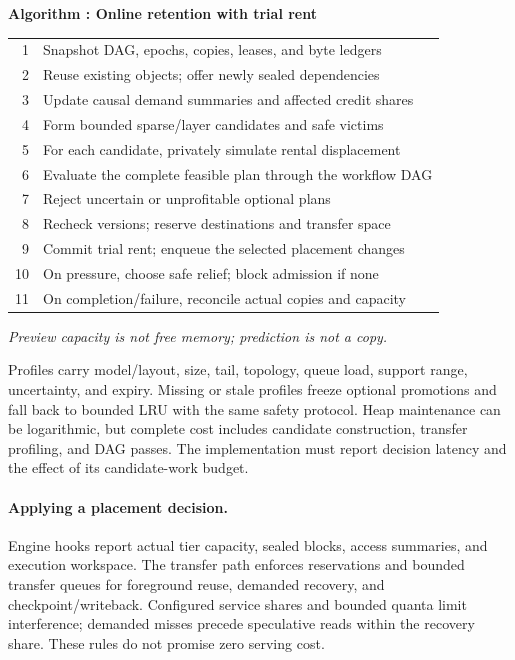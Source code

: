 \par\medskip\noindent\begin{minipage}{\columnwidth}
\raggedright
 \label{alg:placement}
 \textbf{Algorithm \thedesignalgorithm: Online retention with trial rent}
 \par\smallskip
 \begin{tabularx}{\columnwidth}{@{}r@{\quad}X@{}}
 \toprule
 1 & Snapshot DAG, epochs, copies, leases, and byte ledgers \\
 2 & Reuse existing objects; offer newly sealed dependencies \\
 3 & Update causal demand summaries and affected credit shares \\
 4 & Form bounded sparse/layer candidates and safe victims \\
 5 & For each candidate, privately simulate rental displacement \\
 6 & Evaluate the complete feasible plan through the workflow DAG \\
 7 & Reject uncertain or unprofitable optional plans \\
 8 & Recheck versions; reserve destinations and transfer space \\
 9 & Commit trial rent; enqueue the selected placement changes \\
 10 & On pressure, choose safe relief; block admission if none \\
 11 & On completion/failure, reconcile actual copies and capacity \\
 \bottomrule
 \end{tabularx}
 \par\smallskip\noindent\textit{Preview capacity is not free memory; prediction is not a copy.}
 \end{minipage}\par\medskip

Profiles carry model/layout, size, tail, topology, queue load, support
range, uncertainty, and expiry. Missing or stale profiles freeze optional
promotions and fall back to bounded LRU with the same safety protocol.
Heap maintenance can be logarithmic, but complete cost includes candidate
construction, transfer profiling, and DAG passes. The implementation must
report decision latency and the effect of its candidate-work budget.

\paragraph{Applying a placement decision.}
Engine hooks report actual tier capacity, sealed blocks, access summaries,
and execution workspace. The transfer path enforces
reservations and bounded transfer queues for foreground reuse, demanded
recovery, and checkpoint/writeback. Configured service shares and bounded
quanta limit interference; demanded misses precede speculative reads
within the recovery share. These rules do not promise zero serving cost.

